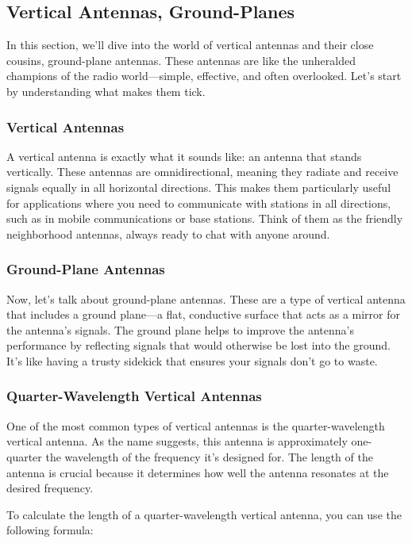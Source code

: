 \subsection{Vertical Antennas, Ground-Planes}
\label{subsec:verticals}

In this section, we'll dive into the world of vertical antennas and their close cousins, ground-plane antennas. These antennas are like the unheralded champions of the radio world—simple, effective, and often overlooked. Let's start by understanding what makes them tick.

\subsubsection*{Vertical Antennas}
A vertical antenna is exactly what it sounds like: an antenna that stands vertically. These antennas are omnidirectional, meaning they radiate and receive signals equally in all horizontal directions. This makes them particularly useful for applications where you need to communicate with stations in all directions, such as in mobile communications or base stations. Think of them as the friendly neighborhood antennas, always ready to chat with anyone around.

\subsubsection*{Ground-Plane Antennas}
Now, let's talk about ground-plane antennas. These are a type of vertical antenna that includes a ground plane—a flat, conductive surface that acts as a mirror for the antenna's signals. The ground plane helps to improve the antenna's performance by reflecting signals that would otherwise be lost into the ground. It's like having a trusty sidekick that ensures your signals don't go to waste.

\subsubsection*{Quarter-Wavelength Vertical Antennas}
One of the most common types of vertical antennas is the quarter-wavelength vertical antenna. As the name suggests, this antenna is approximately one-quarter the wavelength of the frequency it's designed for. The length of the antenna is crucial because it determines how well the antenna resonates at the desired frequency. 

To calculate the length of a quarter-wavelength vertical antenna, you can use the following formula:

